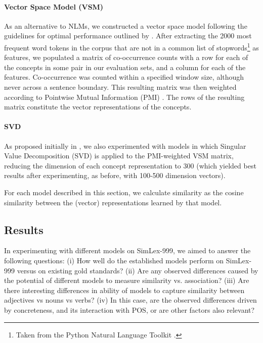 \paragraph{\bf Vector Space Model (VSM)}

As an alternative to NLMs, we constructed a vector space model following the guidelines for optimal performance outlined by \cite{kiela2014systematic}. After extracting the 2000 most frequent word tokens in the corpus that are not in a common list of stopwords\footnote{Taken from the Python Natural Language Toolkit \cite{bird2006nltk}.} as features, we populated a matrix of co-occurrence counts with a row for each of the concepts in some pair in our evaluation sets, and a column for each of the features. Co-occurrence was counted within a specified window size, although never across a sentence boundary. This resulting matrix was then weighted according to Pointwise Mutual Information (PMI) \cite{recchia2009more}. The rows of the resulting matrix constitute the vector representations of the concepts.   

\paragraph{\bf SVD} As proposed initially in \cite{landauer1997solution}, we also experimented with models in which Singular Value Decomposition (SVD) \cite{golub1970singular} is applied to the PMI-weighted VSM matrix, reducing the dimension of each concept representation to 300 (which yielded best results after experimenting, as before, with 100-500 dimension vectors). 

\vspace{1\baselineskip}

\noindent 
For each model described in this section, we calculate similarity as the cosine similarity between the (vector) representations learned by that model. 

\subsection{Results}

In experimenting with different models on SimLex-999, we aimed to answer the following questions: (i) How well do the established models perform on SimLex-999 versus on existing gold standards? (ii) Are any observed differences caused by the potential of different models to measure similarity vs. association? (iii) Are there interesting differences in ability of models to capture similarity between adjectives vs nouns vs verbs? (iv) In this case, are the observed differences driven by concreteness, and its interaction with POS, or are other factors also relevant?

